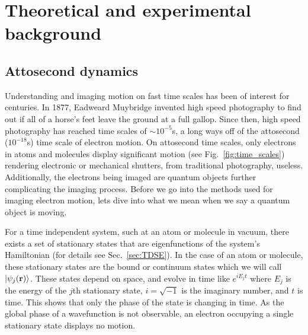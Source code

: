 \chapter{Theoretical and experimental background} %
\label{cha:theoretical_background}
\section{Attosecond dynamics} %
\label{sec:attosecond_dynamics}

Understanding and imaging motion on fast time scales has been of interest for centuries. In 1877, Eadweard Muybridge invented high speed photography to find out if all of a horse's feet leave the ground at a full gallop. Since then, high speed photography has reached time scales of $\sim10^{-5}$s, a long ways off of the attosecond ($10^{-18}$s) time scale of electron motion. On attosecond time scales, only electrons in atoms and molecules display significant motion (see Fig.~\ref{fig:time_scales}) rendering electronic or mechanical shutters, from traditional photography, useless. Additionally, the electrons being imaged are quantum objects further complicating the imaging process. Before we go into the methods used for imaging electron motion, lets dive into what we mean when we say a quantum object is moving. 

For a time independent system, such at an atom or molecule in vacuum, there exists a set of stationary states that are eigenfunctions of the system's Hamiltonian (for details see Sec.~\ref{sec:TDSE}). In the case of an atom or molecule, these stationary states are the bound or continuum states which we will call $\ket{\psi_j(\mathbf{r})}$. These states depend on space, and evolve in time like $e^{iE_j t}$ where $E_j$ is the energy of the $j$th stationary state, $i=\sqrt{-1}$ is the imaginary number, and $t$ is time. This shows that only the phase of the state is changing in time. As the global phase of a wavefunction is not observable, an electron occupying a single stationary state displays no motion. 

